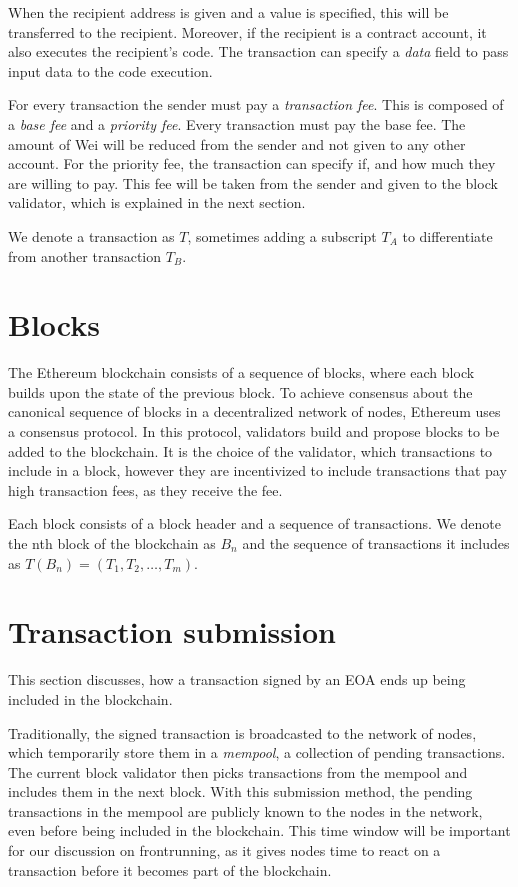 \documentclass[draft,final]{vutinfth} %
\begin{document}
When the recipient address is given and a value is specified, this will be transferred to the recipient. Moreover, if the recipient is a contract account, it also executes the recipient's code. The transaction can specify a \emph{data} field to pass input data to the code execution. \cite[p.4-5]{wood_ethereum_2024}


For every transaction the sender must pay a \emph{transaction fee}. This is composed of a \emph{base fee} and a \emph{priority fee}. Every transaction must pay the base fee. The amount of Wei will be reduced from the sender and not given to any other account. For the priority fee, the transaction can specify if, and how much they are willing to pay. This fee will be taken from the sender and given to the block validator, which is explained in the next section. \cite[p.8]{wood_ethereum_2024}

We denote a transaction as $T$, sometimes adding a subscript $T_A$ to differentiate from another transaction $T_B$.

\section{Blocks}

The Ethereum blockchain consists of a sequence of blocks, where each block builds upon the state of the previous block. To achieve consensus about the canonical sequence of blocks in a decentralized network of nodes, Ethereum uses a consensus protocol. In this protocol, validators build and propose blocks to be added to the blockchain. \cite{noauthor_gasper_2023} It is the choice of the validator, which transactions to include in a block, however they are incentivized to include transactions that pay high transaction fees, as they receive the fee. \cite[p.8]{wood_ethereum_2024}

Each block consists of a block header and a sequence of transactions. We denote the nth block of the blockchain as $B_n$ and the sequence of transactions it includes as $T(B_n) = (T_1, T_2, \dots, T_m)$.

\section{Transaction submission}

This section discusses, how a transaction signed by an EOA ends up being included in the blockchain.

Traditionally, the signed transaction is broadcasted to the network of nodes, which temporarily store them in a \emph{mempool}, a collection of pending transactions. The current block validator then picks transactions from the mempool and includes them in the next block. With this submission method, the pending transactions in the mempool are publicly known to the nodes in the network, even before being included in the blockchain. This time window will be important for our discussion on frontrunning, as it gives nodes time to react on a transaction before it becomes part of the blockchain. \cite{eskandari_sok_2020}
\end{document}
